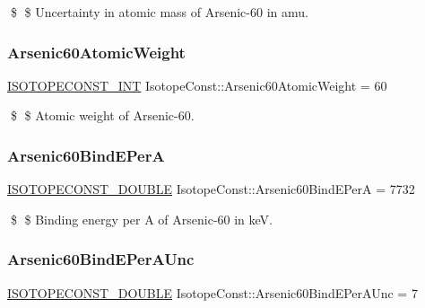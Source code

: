\$ \$ Uncertainty in atomic mass of Arsenic-\/60 in amu. \mbox{\label{group___isotope_const-_arsenic-_as60_ga090575b6603decf876b9f0e8fcf0f089}} 
\subsubsection{\texorpdfstring{Arsenic60\+Atomic\+Weight}{Arsenic60AtomicWeight}}
{\footnotesize\ttfamily \mbox{\hyperlink{group___isotope_const-_macros_ga5f18360b3e99483a35c32d789e62621c}{I\+S\+O\+T\+O\+P\+E\+C\+O\+N\+S\+T\+\_\+\+I\+NT}} Isotope\+Const\+::\+Arsenic60\+Atomic\+Weight = 60}

\$ \$ Atomic weight of Arsenic-\/60. \mbox{\label{group___isotope_const-_arsenic-_as60_ga3766a18da870d2fd6233bf0477d74d11}} 
\subsubsection{\texorpdfstring{Arsenic60\+Bind\+E\+PerA}{Arsenic60BindEPerA}}
{\footnotesize\ttfamily \mbox{\hyperlink{group___isotope_const-_macros_ga8f45a7272ce02c0b4c65c44636ed719a}{I\+S\+O\+T\+O\+P\+E\+C\+O\+N\+S\+T\+\_\+\+D\+O\+U\+B\+LE}} Isotope\+Const\+::\+Arsenic60\+Bind\+E\+PerA = 7732}

\$ \$ Binding energy per A of Arsenic-\/60 in keV. \mbox{\label{group___isotope_const-_arsenic-_as60_ga2b884e6b37054e3b24afc6381b545f36}} 
\subsubsection{\texorpdfstring{Arsenic60\+Bind\+E\+Per\+A\+Unc}{Arsenic60BindEPerAUnc}}
{\footnotesize\ttfamily \mbox{\hyperlink{group___isotope_const-_macros_ga8f45a7272ce02c0b4c65c44636ed719a}{I\+S\+O\+T\+O\+P\+E\+C\+O\+N\+S\+T\+\_\+\+D\+O\+U\+B\+LE}} Isotope\+Const\+::\+Arsenic60\+Bind\+E\+Per\+A\+Unc = 7}

